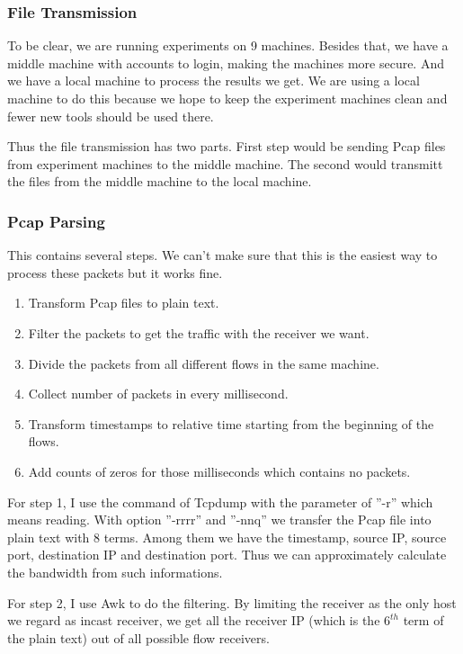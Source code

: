 \documentclass[12pt,a4paper]{article}
\begin{document}
\subsubsection{File Transmission}
To be clear, we are running experiments on 9 machines.
Besides that, we have a middle machine with accounts to login, making the machines more secure.
And we have a local machine to process the results we get. We are using a local machine to do this because
we hope to keep the experiment machines clean and fewer new tools should be used there.

Thus the file transmission has two parts. First step would be sending Pcap files from experiment machines to the middle machine.
The second would transmitt the files from the middle machine to the local machine.

\subsubsection{Pcap Parsing}
This contains several steps. We can't make sure that this is the easiest way to process these packets but it works fine.
\begin{enumerate}
	\item Transform Pcap files to plain text.
	\item Filter the packets to get the traffic with the receiver we want.
	\item Divide the packets from all different flows in the same machine.
	\item Collect number of packets in every millisecond.
	\item Transform timestamps to relative time starting from the beginning of the flows.
	\item Add counts of zeros for those milliseconds which contains no packets.
\end{enumerate}

For step 1, I use the command of Tcpdump with the parameter of ''-r'' which means reading.
With option ''-rrrr'' and ''-nnq'' we transfer the Pcap file into plain text with 8 terms.
Among them we have the timestamp, source IP, source port, destination IP and destination port.
Thus we can approximately calculate the bandwidth from such informations.

For step 2, I use Awk to do the filtering. By limiting the receiver as the only host we regard as incast receiver, we get all the receiver IP (which is the
$6^{th}$ term of the plain text) out of all possible flow receivers.
\end{document}
